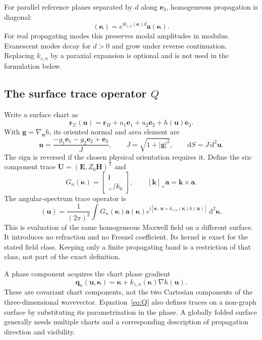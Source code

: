 \documentclass[11pt,a4paper]{article}
\newcommand{\vct}[1]{\bm{#1}}
\newcommand{\kap}{\vct\kappa}
\newcommand{\dd}{\mathrm d}
\newcommand{\ii}{\mathrm i}
\newcommand{\Id}{\mathsf I}
\newcommand{\cross}[1]{[#1]_{\times}}
\newcommand{\Q}{\mathcal Q}
\newcommand{\R}{\mathcal R}
\numberwithin{equation}{section}
\begin{document}
For parallel reference planes separated by $d$ along $\vct e_3$, homogeneous
propagation is diagonal:
\begin{equation}
 [\R_n(d)\vct a](\kap)=e^{\ii k_{z,n}(\kap)d}\vct a(\kap).
 \label{eq:R}
\end{equation}
For real propagating modes this preserves modal amplitudes in modulus.
Evanescent modes decay for $d>0$ and grow under reverse continuation. Replacing
$k_{z,n}$ by a paraxial expansion is optional and is not used in the formulation
below.

\subsection{The surface trace operator \texorpdfstring{$Q$}{Q}}

Write a surface chart as
\begin{equation}
 \vct r_\Sigma(\vct u)=\vct r_\Pi+u_1\vct e_1+u_2\vct e_2+h(\vct u)\vct e_3.
\end{equation}
With $\vct g=\nabla_{\vct u}h$, its oriented normal and area element are
\begin{equation}
 \vct n=\frac{-g_1\vct e_1-g_2\vct e_2+\vct e_3}{J},\qquad
 J=\sqrt{1+|\vct g|^2},\qquad \dd S=J\,\dd^2\vct u.
 \label{eq:geometry}
\end{equation}
The sign is reversed if the chosen physical orientation requires it. Define
the six-component trace $\vct U=(\vct E,Z_0\vct H)^\mathsf T$ and
\begin{equation}
 G_n(\kap)=\begin{bmatrix}\Id\\\cross{\vct k_n(\kap)}/k_0\end{bmatrix},
 \qquad \cross{\vct k}\vct a=\vct k\times\vct a.
\end{equation}
The angular-spectrum trace operator is
\begin{equation}
 [\Q_{n,\Sigma}\vct a](\vct u)=\frac{1}{(2\pi)^2}\int
 G_n(\kap)\vct a(\kap)
 e^{\ii[\kap\cdot\vct u+k_{z,n}(\kap)h(\vct u)]}\,\dd^2\kap.
 \label{eq:Q}
\end{equation}
This is evaluation of the same homogeneous Maxwell field on a different
surface. It introduces no refraction and no Fresnel coefficient. Its kernel
is exact for the stated field class. Keeping only a finite propagating band
is a restriction of that class, not part of the exact definition.

A phase component acquires the chart phase gradient
\begin{equation}
 \vct q_n(\vct u,\kap)=\kap+k_{z,n}(\kap)\nabla h(\vct u).
 \label{eq:chartq}
\end{equation}
These are covariant chart components, not the two Cartesian components of the
three-dimensional wavevector. Equation~\eqref{eq:Q} also defines traces on a
non-graph surface by substituting its parametrization in the phase. A globally
folded surface generally needs multiple charts and a corresponding description
of propagation direction and visibility.
\end{document}
